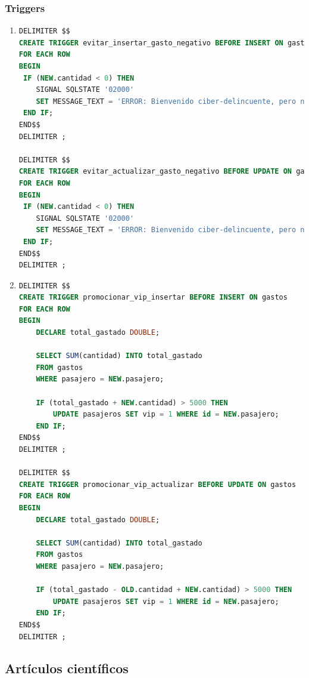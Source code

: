 \documentclass{db-practice}
\begin{document}
\subsubsection*{Triggers}
\begin{enumerate}
\item
\begin{lstlisting}[language=SQL]
DELIMITER $$
CREATE TRIGGER evitar_insertar_gasto_negativo BEFORE INSERT ON gastos
FOR EACH ROW
BEGIN
 IF (NEW.cantidad < 0) THEN
    SIGNAL SQLSTATE '02000'
    SET MESSAGE_TEXT = 'ERROR: Bienvenido ciber-delincuente, pero no puedes sacar dinero en un entretenimiento.';
 END IF;
END$$
DELIMITER ; 

DELIMITER $$
CREATE TRIGGER evitar_actualizar_gasto_negativo BEFORE UPDATE ON gastos
FOR EACH ROW
BEGIN
 IF (NEW.cantidad < 0) THEN
    SIGNAL SQLSTATE '02000'
    SET MESSAGE_TEXT = 'ERROR: Bienvenido ciber-delincuente, pero no puedes sacar dinero en un entretenimiento.';
 END IF;
END$$
DELIMITER ; 
\end{lstlisting}

\item
\begin{lstlisting}[language=SQL]
DELIMITER $$
CREATE TRIGGER promocionar_vip_insertar BEFORE INSERT ON gastos
FOR EACH ROW
BEGIN
    DECLARE total_gastado DOUBLE;
    
    SELECT SUM(cantidad) INTO total_gastado
    FROM gastos
    WHERE pasajero = NEW.pasajero;
    
    IF (total_gastado + NEW.cantidad) > 5000 THEN
        UPDATE pasajeros SET vip = 1 WHERE id = NEW.pasajero;
    END IF;
END$$
DELIMITER ;  

DELIMITER $$
CREATE TRIGGER promocionar_vip_actualizar BEFORE UPDATE ON gastos
FOR EACH ROW
BEGIN
    DECLARE total_gastado DOUBLE;
    
    SELECT SUM(cantidad) INTO total_gastado
    FROM gastos
    WHERE pasajero = NEW.pasajero;
    
    IF (total_gastado - OLD.cantidad + NEW.cantidad) > 5000 THEN
        UPDATE pasajeros SET vip = 1 WHERE id = NEW.pasajero;
    END IF;
END$$
DELIMITER ;  
\end{lstlisting}
\end{enumerate}

\subsection*{Artículos científicos}
\end{document}
